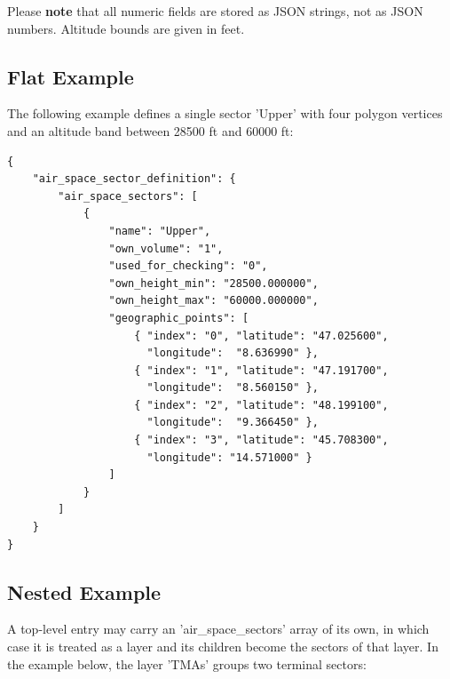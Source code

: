 Please \textbf{note} that all numeric fields are stored as JSON strings, not as JSON numbers. Altitude bounds are given in feet. \\

\subsection{Flat Example}

The following example defines a single sector 'Upper' with four polygon vertices and an altitude band between 28500 ft and 60000 ft:

\begin{lstlisting}[basicstyle=\small\ttfamily]
{
    "air_space_sector_definition": {
        "air_space_sectors": [
            {
                "name": "Upper",
                "own_volume": "1",
                "used_for_checking": "0",
                "own_height_min": "28500.000000",
                "own_height_max": "60000.000000",
                "geographic_points": [
                    { "index": "0", "latitude": "47.025600",
                      "longitude":  "8.636990" },
                    { "index": "1", "latitude": "47.191700",
                      "longitude":  "8.560150" },
                    { "index": "2", "latitude": "48.199100",
                      "longitude":  "9.366450" },
                    { "index": "3", "latitude": "45.708300",
                      "longitude": "14.571000" }
                ]
            }
        ]
    }
}
\end{lstlisting}

\subsection{Nested Example}

A top-level entry may carry an 'air\_space\_sectors' array of its own, in which case it is treated as a layer and its children become the sectors of that layer. In the example below, the layer 'TMAs' groups two terminal sectors: \\

